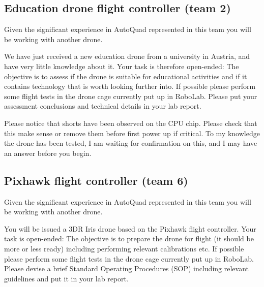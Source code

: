 \documentclass[a4paper,10pt,fleqn]{article}
\begin{document}
\subsection{Education drone flight controller (team 2)}
Given the significant experience in AutoQuad represented in this team you will be working with another drone.

We have just received a new education drone from a university in Austria, and have very little knowledge about it. Your task is therefore open-ended: The objective is to assess if the drone is suitable for educational activities and if it contains technology that is worth looking further into. If possible please perform some flight tests in the drone cage currently put up in RoboLab. Please put your assessment conclusions and technical details in your lab report.

Please notice that shorts have been observed on the CPU chip. Please check that this make sense or remove them before first power up if critical. To my knowledge the drone has been tested, I am waiting for confirmation on this, and I may have an answer before you begin.


\subsection{Pixhawk flight controller (team 6)}
Given the significant experience in AutoQuad represented in this team you will be working with another drone.

You will be issued a 3DR Iris drone based on the Pixhawk flight controller. Your task is open-ended: The objective is to prepare the drone for flight (it should be more or less ready) including performing relevant calibrations etc. If possible please perform some flight tests in the drone cage currently put up in RoboLab. Please devise a brief Standard Operating Procedures (SOP) including relevant guidelines and put it in your lab report.
\end{document}
